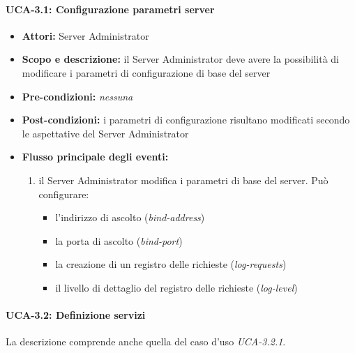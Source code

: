 \paragraph{UCA-3.1: Configurazione parametri server}

\begin{itemize}
	\item \textbf{Attori:} Server Administrator
	\item \textbf{Scopo e descrizione:} il Server Administrator deve avere la possibilità di modificare i parametri di configurazione di base del server
	\item \textbf{Pre-condizioni:} \emph{nessuna}
	\item \textbf{Post-condizioni:} i parametri di configurazione risultano modificati secondo le aspettative del Server Administrator
	\item \textbf{Flusso principale degli eventi:}
		\begin{enumerate}
			\item il Server Administrator modifica i parametri di base del server. Può configurare:
				\begin{itemize}
					\item l'indirizzo di ascolto (\emph{bind-address})
					\item la porta di ascolto (\emph{bind-port})
					\item la creazione di un registro delle richieste (\emph{log-requests})
					\item il livello di dettaglio del registro delle richieste (\emph{log-level})
				\end{itemize}
		\end{enumerate}
\end{itemize}


\paragraph{UCA-3.2: Definizione servizi}

La descrizione comprende anche quella del caso d'uso \emph{UCA-3.2.1}.

